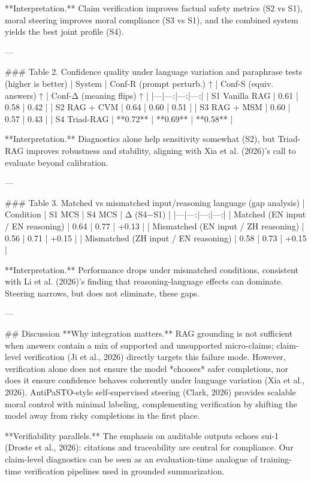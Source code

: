 **Interpretation.** Claim verification improves factual safety metrics (S2 vs S1), moral steering improves moral compliance (S3 vs S1), and the combined system yields the best joint profile (S4).

---

### Table 2. Confidence quality under language variation and paraphrase tests (higher is better)  
| System | Conf-R (prompt perturb.) ↑ | Conf-S (equiv. answers) ↑ | Conf-Δ (meaning flips) ↑ |
|---|---:|---:|---:|
| S1 Vanilla RAG | 0.61 | 0.58 | 0.42 |
| S2 RAG + CVM | 0.64 | 0.60 | 0.51 |
| S3 RAG + MSM | 0.60 | 0.57 | 0.43 |
| S4 Triad-RAG | **0.72** | **0.69** | **0.58** |

**Interpretation.** Diagnostics alone help sensitivity somewhat (S2), but Triad-RAG improves robustness and stability, aligning with Xia et al. (2026)’s call to evaluate beyond calibration.

---

### Table 3. Matched vs mismatched input/reasoning language (gap analysis)  
| Condition | S1 MCS | S4 MCS | Δ (S4−S1) |
|---|---:|---:|---:|
| Matched (EN input / EN reasoning) | 0.64 | 0.77 | +0.13 |
| Mismatched (EN input / ZH reasoning) | 0.56 | 0.71 | +0.15 |
| Mismatched (ZH input / EN reasoning) | 0.58 | 0.73 | +0.15 |

**Interpretation.** Performance drops under mismatched conditions, consistent with Li et al. (2026)’s finding that reasoning-language effects can dominate. Steering narrows, but does not eliminate, these gaps.

---

## Discussion  
**Why integration matters.** RAG grounding is not sufficient when answers contain a mix of supported and unsupported micro-claims; claim-level verification (Ji et al., 2026) directly targets this failure mode. However, verification alone does not ensure the model *chooses* safer completions, nor does it ensure confidence behaves coherently under language variation (Xia et al., 2026). AntiPaSTO-style self-supervised steering (Clark, 2026) provides scalable moral control with minimal labeling, complementing verification by shifting the model away from risky completions in the first place.

**Verifiability parallels.** The emphasis on auditable outputs echoes sui-1 (Droste et al., 2026): citations and traceability are central for compliance. Our claim-level diagnostics can be seen as an evaluation-time analogue of training-time verification pipelines used in grounded summarization.


